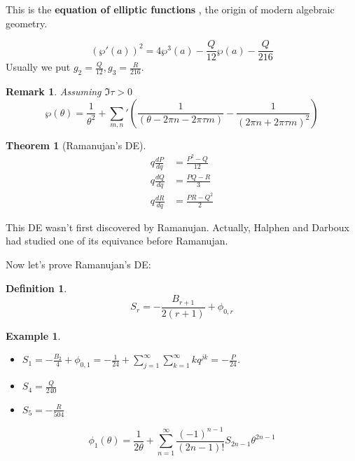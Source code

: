 \documentclass{article}
\newtheorem{Thm}{Theorem}[section]
\newtheorem{Def}{Definition}[section]
\newtheorem{Rmk}{Remark}[section]
\newtheorem{Eg}{Example}[section]
\begin{document}
This is the \textbf{equation of elliptic functions} , the origin of modern algebraic geometry.

\begin{equation}
(\wp'(a))^2 = 4\wp^3(a) - \frac{Q}{12}\wp(a) - \frac{Q}{216}
\end{equation}
Usually we put $g_2 = \frac{Q}{12}, g_3 = \frac{R}{216}$.
\begin{Rmk}
 Assuming $\Im\tau>0$
\begin{equation}
\wp(\theta) = \frac{1}{\theta^2} + \sum\limits_{m,n}' \left( \frac{1}{(\theta - 2\pi n -2\pi\tau m)} - \frac{1}{(2\pi n + 2\pi \tau m)^2} \right)
\end{equation}
\end{Rmk}

\begin{Thm}[Ramanujan's DE]
\begin{align*}
 q \frac{dP}{dq} &= \frac{P^2-Q}{12}\\
 q \frac{dQ}{dq} &=\frac{PQ-R}{3}\\
 q \frac{dR}{dq} &= \frac{PR-Q^2}{2}
\end{align*}
\end{Thm}

This DE wasn't first discovered by Ramanujan. Actually, Halphen and Darboux had studied one of its equivance before Ramanujan.

Now let's prove Ramanujan's DE:

\begin{Def}
\begin{equation}
S_r = -\frac{B_{r+1}}{2(r+1)} + \phi_{0,r}
\end{equation}
\end{Def}

\begin{Eg}
  
\begin{itemize}
\item $S_1 = -\frac{B_2}{4} + \phi_{0,1} = - \frac{1}{24} + \sum\limits_{j=1}^{\infty}\sum\limits_{k=1}^{\infty} k q^{jk} = - \frac{P}{24}$.
\item $S_4 = \frac{Q}{240}$
\item $S_5 = - \frac{R}{504}$
\end{itemize}
\end{Eg}

\begin{equation}
\phi_1(\theta) = \frac{1}{2\theta} + \sum\limits_{n=1}^{\infty} \frac{(-1)^{n-1}}{(2n-1)!} S_{2n-1}\theta^{2n-1}
\end{equation}
\end{document}
